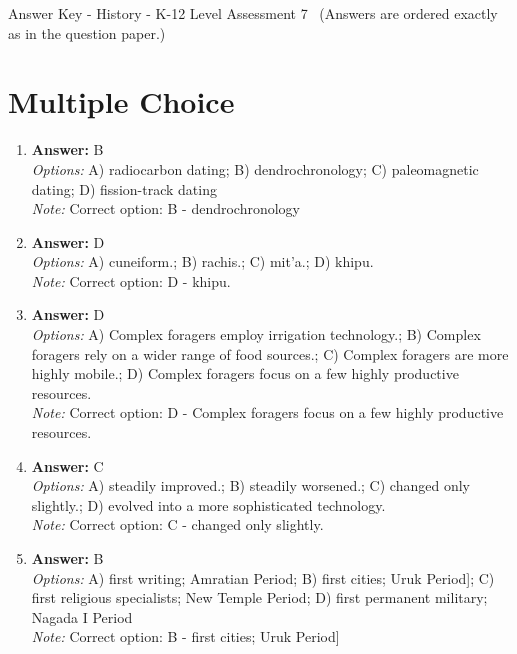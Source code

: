 \documentclass[12pt]{article}
\begin{document}
\begin{center}
Answer Key - History - K-12 Level Assessment 7 \
\small (Answers are ordered exactly as in the question paper.)
\end{center}

\section*{Multiple Choice}
\begin{enumerate}[label=\arabic*.]
\item \textbf{Answer:} B
\\ \textit{Options:} A) radiocarbon dating; B) dendrochronology; C) paleomagnetic dating; D) fission-track dating
\\ \textit{Note:} Correct option: B - dendrochronology
\item \textbf{Answer:} D
\\ \textit{Options:} A) cuneiform.; B) rachis.; C) mit'a.; D) khipu.
\\ \textit{Note:} Correct option: D - khipu.
\item \textbf{Answer:} D
\\ \textit{Options:} A) Complex foragers employ irrigation technology.; B) Complex foragers rely on a wider range of food sources.; C) Complex foragers are more highly mobile.; D) Complex foragers focus on a few highly productive resources.
\\ \textit{Note:} Correct option: D - Complex foragers focus on a few highly productive resources.
\item \textbf{Answer:} C
\\ \textit{Options:} A) steadily improved.; B) steadily worsened.; C) changed only slightly.; D) evolved into a more sophisticated technology.
\\ \textit{Note:} Correct option: C - changed only slightly.
\item \textbf{Answer:} B
\\ \textit{Options:} A) first writing; Amratian Period; B) first cities; Uruk Period]; C) first religious specialists; New Temple Period; D) first permanent military; Nagada I Period
\\ \textit{Note:} Correct option: B - first cities; Uruk Period]
\end{enumerate}
\end{document}
